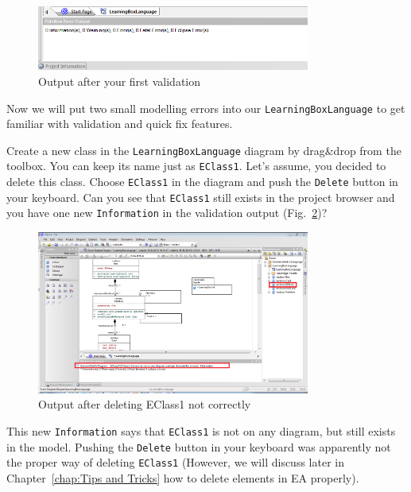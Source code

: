 \begin{figure}[htbp]
	\centering 
  \includegraphics[width=0.8\textwidth]{pics/memBoxBilder/memBox42} 
	\caption{Output after your first validation}
	\label{fig:first_validation}
\end{figure}

Now we will put two small modelling errors into our \texttt{LearningBoxLanguage} to get familiar with validation and quick fix features.

Create a new class in the \texttt{Learning\-Box\-Language} diagram by drag\&drop from the toolbox. 
You can keep its name just as \texttt{EClass1}. Let's assume, you decided to delete this class. 
Choose \texttt{EClass1} in the diagram and push the \texttt{Delete} button in your keyboard. 
Can you see that \texttt{EClass1} still exists in the project browser and you have one new \texttt{Information} in the validation output (Fig.~\ref{fig:validation_information})?

\begin{figure}[htbp]
	\centering 
  \includegraphics[width=0.8\textwidth]{pics/memBoxBilder/memBox43} 
	\caption{Output after deleting EClass1 not correctly}
	\label{fig:validation_information}
\end{figure}

This new \texttt{Information} says that \texttt{EClass1} is not on any diagram, but still exists in the model. 
Pushing the \texttt{Delete} button in your keyboard was apparently not the proper way of deleting \texttt{EClass1} (However, we will discuss later in Chapter~\ref{chap:Tips and Tricks} how to delete elements in EA properly).

